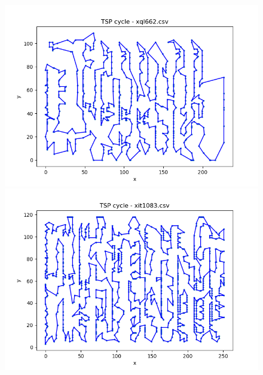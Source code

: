 \documentclass[12pt]{article}
\begin{document}
        \begin{figure}[h]
            \centering
            \includegraphics[width=0.8\linewidth]{img/xql662.png}
            \label{fig:xql662}
            \includegraphics[width=0.8\linewidth]{img/xit1083.png}
            \label{fig:xit1083}
        \end{figure}

        \newpage
\end{document}
